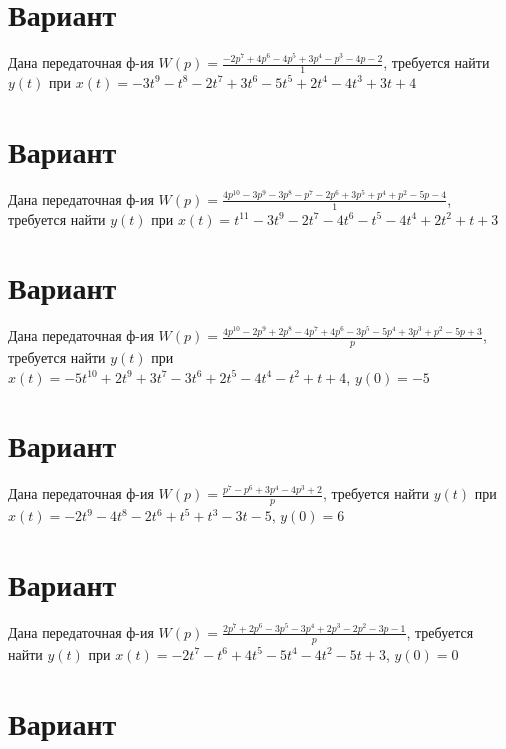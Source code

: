 \documentclass{article}
\begin{document}
\section{Вариант}

Дана передаточная ф-ия $W(p)=\frac{-2p^{7}+4p^{6}-4p^{5}+3p^{4}-p^{3}-4p-2}{1}$, требуется найти $y(t)$ при $x(t)=-3t^{9}-t^{8}-2t^{7}+3t^{6}-5t^{5}+2t^{4}-4t^{3}+3t+4$



\section{Вариант}

Дана передаточная ф-ия $W(p)=\frac{4p^{10}-3p^{9}-3p^{8}-p^{7}-2p^{6}+3p^{5}+p^{4}+p^{2}-5p-4}{1}$, требуется найти $y(t)$ при $x(t)=t^{11}-3t^{9}-2t^{7}-4t^{6}-t^{5}-4t^{4}+2t^{2}+t+3$



\section{Вариант}

Дана передаточная ф-ия $W(p)=\frac{4p^{10}-2p^{9}+2p^{8}-4p^{7}+4p^{6}-3p^{5}-5p^{4}+3p^{3}+p^{2}-5p+3}{p}$, требуется найти $y(t)$ при $x(t)=-5t^{10}+2t^{9}+3t^{7}-3t^{6}+2t^{5}-4t^{4}-t^{2}+t+4$, $y(0)=-5$



\section{Вариант}

Дана передаточная ф-ия $W(p)=\frac{p^{7}-p^{6}+3p^{4}-4p^{3}+2}{p}$, требуется найти $y(t)$ при $x(t)=-2t^{9}-4t^{8}-2t^{6}+t^{5}+t^{3}-3t-5$, $y(0)=6$



\section{Вариант}

Дана передаточная ф-ия $W(p)=\frac{2p^{7}+2p^{6}-3p^{5}-3p^{4}+2p^{3}-2p^{2}-3p-1}{p}$, требуется найти $y(t)$ при $x(t)=-2t^{7}-t^{6}+4t^{5}-5t^{4}-4t^{2}-5t+3$, $y(0)=0$



\section{Вариант}
\end{document}
